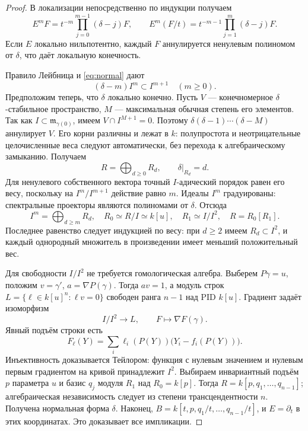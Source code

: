\begin{proof}
В локализации непосредственно по индукции получаем
\begin{equation}\label{eq:falling}
E^mF=t^{-m}\prod_{j=0}^{m-1}(\delta-j)F,
\qquad
E^m(F/t)=t^{-m-1}\prod_{j=1}^{m}(\delta-j)F.
\end{equation}
Если $E$ локально нильпотентно, каждый $F$ аннулируется ненулевым
полиномом от $\delta$, что даёт локальную конечность.

Правило Лейбница и \eqref{eq:normal} дают
\[
(\delta-m)I^m\subset I^{m+1}\quad(m\ge0).
\]
Предположим теперь, что $\delta$ локально конечно.
Пусть $V$ --- конечномерное $\delta$-стабильное пространство,
$M$ --- максимальная обычная степень его элементов.
Так как $I\subset\mathfrak m_{\gamma(0)}$, имеем $V\cap I^{M+1}=0$.
Поэтому $\delta(\delta-1)\cdots(\delta-M)$ аннулирует $V$.
Его корни различны и лежат в $k$: полупростота и неотрицательные
целочисленные веса следуют автоматически, без перехода к
алгебраическому замыканию. Получаем
\[
R=\bigoplus_{d\ge0}R_d,\qquad \delta|_{R_d}=d.
\]
Для ненулевого собственного вектора точный $I$-адический порядок
равен его весу, поскольку на $I^m/I^{m+1}$ действие равно $m$.
Идеалы $I^m$ градуированы: спектральные проекторы являются
полиномами от $\delta$. Отсюда
\[
I^m=\bigoplus_{d\ge m}R_d,\quad R_0\simeq R/I\simeq k[u],\quad
R_1\simeq I/I^2,\quad R=R_0[R_1].
\]
Последнее равенство следует индукцией по весу: при $d\ge2$ имеем
$R_d\subset I^2$, и каждый однородный множитель в произведении
имеет меньший положительный вес.

Для свободности $I/I^2$ не требуется гомологическая алгебра.
Выберем $P\gamma=u$, положим $v=\gamma'$, $a=\nabla P(\gamma)$.
Тогда $av=1$, а модуль строк
$L=\{\ell\in k[u]^n:\ell v=0\}$ свободен ранга $n-1$
над PID $k[u]$. Градиент задаёт изоморфизм
\[
I/I^2\longrightarrow L,\qquad F\longmapsto\nabla F(\gamma).
\]
Явный подъём строки есть
\[
F_\ell(Y)=\sum_i\ell_i(P(Y))\bigl(Y_i-f_i(P(Y))\bigr).
\]
Инъективность доказывается Тейлором: функция с нулевым значением
и нулевым первым градиентом на кривой принадлежит $I^2$.
Выбираем инвариантный подъём $p$ параметра $u$ и базис $q_j$ модуля
$R_1$ над $R_0=k[p]$. Тогда $R=k[p,q_1,\ldots,q_{n-1}]$;
алгебраическая независимость следует из степени трансцендентности $n$.
Получена нормальная форма $\delta$.
Наконец, $B=k[t,p,q_1/t,\ldots,q_{n-1}/t]$, и $E=\partial_t$
в этих координатах. Это доказывает все импликации.
\end{proof}

